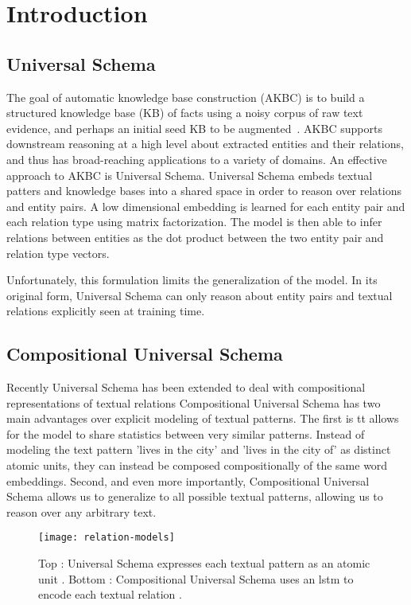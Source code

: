 
\section{Introduction\label{introduction}}


\subsection {Universal Schema}
The goal of automatic knowledge base construction (AKBC) is to build a structured knowledge base (KB) of facts using a noisy corpus of raw text evidence, and perhaps an initial seed KB to be augmented~\citep{NELL,yago,freebase}. AKBC supports downstream reasoning at a high level about extracted entities and their relations, and thus has broad-reaching applications to a variety of domains.
An effective approach to AKBC is Universal Schema.
Universal Schema embeds textual patters and knowledge bases into a shared space in order to reason over relations and entity pairs.
A low dimensional embedding is learned for each entity pair and each relation type using matrix factorization.
The model is then able to infer relations between entities as the dot product between the two entity pair and relation type vectors.

Unfortunately, this formulation limits the generalization of the model.
In its original form, Universal Schema can only reason about entity pairs and textual relations explicitly seen at training time.

\subsection {Compositional Universal Schema}

Recently Universal Schema has been extended to deal with compositional representations of textual relations \citep{toutanova2015representing,verga2015multilingual}
Compositional Universal Schema has two main advantages over explicit modeling of textual patterns.
The first is tt allows for the model to share statistics between very similar patterns.
Instead of modeling the text pattern 'lives in the city' and 'lives in the city of' as distinct atomic units, they can instead be composed compositionally of the same word embeddings.
Second, and even more importantly, Compositional Universal Schema allows us to generalize to all possible textual patterns, allowing us to reason over any arbitrary text.

\begin{figure}[h]
\caption{Top : Universal Schema expresses each textual pattern as an atomic unit \protect\citet{riedel2010modeling}.
Bottom : Compositional Universal Schema uses an lstm to encode each textual relation \protect\cite{verga2015multilingual}. }
\centering
\texttt{[image: relation-models]}
\end{figure}

